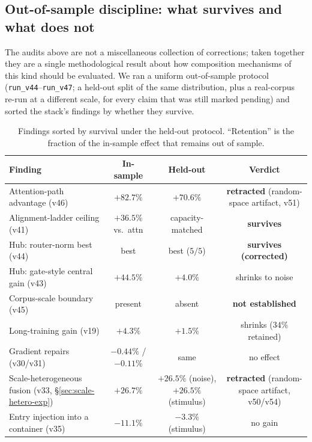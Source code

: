 \documentclass[10pt,twoside]{article}
\theoremstyle{definition}
\theoremstyle{plain}
\theoremstyle{remark}
\begin{document}
\subsection{Out-of-sample discipline: what survives and what does not}
\label{sec:oos}

The audits above are not a miscellaneous collection of corrections; taken together they are a single methodological result about how composition mechanisms of this kind should be evaluated. We ran a uniform out-of-sample protocol (\texttt{run\_v44}--\texttt{run\_v47}; a held-out split of the same distribution, plus a real-corpus re-run at a different scale, for every claim that was still marked pending) and sorted the stack's findings by whether they survive.

\begin{table}[htbp]
\centering
\caption{Findings sorted by survival under the held-out protocol. ``Retention'' is the fraction of the in-sample effect that remains out of sample.}
\label{tab:oos}
\small
\setlength{\tabcolsep}{4.5pt}
\begin{tabular}{p{}ccc}
\toprule
\textbf{Finding} & \textbf{In-sample} & \textbf{Held-out} & \textbf{Verdict} \\
\midrule
Attention-path advantage (v46) & $+82.7\%$ & $+70.6\%$ & \textbf{retracted} (random-space artifact, v51) \\
Alignment-ladder ceiling (v41) & $+36.5\%$ vs.\ attn & capacity-matched & \textbf{survives} \\
Hub: router-norm best (v44) & best & best ($5/5$) & \textbf{survives (corrected)} \\
Hub: gate-style central gain (v43) & $+44.5\%$ & $+4.0\%$ & shrinks to noise \\
Corpus-scale boundary (v45) & present & absent & \textbf{not established} \\
Long-training gain (v19) & $+4.3\%$ & $+1.5\%$ & shrinks ($34\%$ retained) \\
Gradient repairs (v30/v31) & $-0.44\%$ / $-0.11\%$ & same & no effect \\
Scale-heterogeneous fusion (v33, \S\ref{sec:scale-hetero-exp}) & $+26.7\%$ & $+26.5\%$ (noise), $+26.5\%$ (stimulus) & \textbf{retracted} (random-space artifact, v50/v54) \\
Entry injection into a container (v35) & $-11.1\%$ & $-3.3\%$ (stimulus) & no gain \\
\bottomrule
\end{tabular}
\end{table}
\end{document}
